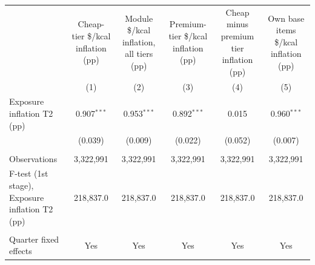 \begingroup
\centering
\begin{tabular*}{\textwidth}{@{\extracolsep{\fill}}lccccc}
   \toprule
                                                  & Cheap-tier \$/kcal inflation (pp)  & Module \$/kcal inflation, all tiers (pp)  & Premium-tier \$/kcal inflation (pp)  & Cheap minus premium tier inflation (pp) & Own base items \$/kcal inflation (pp)\\   
                                                  & (1)                                & (2)                                       & (3)                                  & (4)                                     & (5)\\  
   \midrule 
   Exposure inflation T2 (pp)                     & 0.907$^{***}$                      & 0.953$^{***}$                             & 0.892$^{***}$                        & 0.015                                   & 0.960$^{***}$\\   
                                                  & (0.039)                            & (0.009)                                   & (0.022)                              & (0.052)                                 & (0.007)\\   
    \\
   Observations                                   & 3,322,991                          & 3,322,991                                 & 3,322,991                            & 3,322,991                               & 3,322,991\\  
   F-test (1st stage), Exposure inflation T2 (pp) & 218,837.0                          & 218,837.0                                 & 218,837.0                            & 218,837.0                               & 218,837.0\\  
    \\
   Quarter fixed effects                          & Yes                                & Yes                                       & Yes                                  & Yes                                     & Yes\\  
   \bottomrule
\end{tabular*}
\par\endgroup

